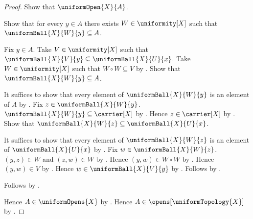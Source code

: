 \begin{proof}
    Show that $\uniformOpen{X}{A}$.
    \begin{subproof}
        Show that for every $y\in A$ there exists $W\in\uniformity[X]$
            such that $\uniformBall{X}{W}{y}\subseteq A$.
        \begin{subproof}
            Fix $y\in A$.
            Take $V\in\uniformity[X]$ such that
                $\uniformBall{X}{V}{y}\subseteq\uniformBall{X}{U}{x}$.
            Take $W\in\uniformity[X]$ such that $W\circ W\subseteq V$
                by .
            Show that $\uniformBall{X}{W}{y}\subseteq A$.
            \begin{subproof}
                It suffices to show that every element of
                    $\uniformBall{X}{W}{y}$ is an element of $A$
                    by .
                Fix $z\in\uniformBall{X}{W}{y}$.
                $\uniformBall{X}{W}{y}\subseteq\carrier[X]$
                    by .
                Hence $z\in\carrier[X]$ by .
                Show that $\uniformBall{X}{W}{z}
                    \subseteq\uniformBall{X}{U}{x}$.
                \begin{subproof}
                    It suffices to show that every element of
                        $\uniformBall{X}{W}{z}$ is an element of
                        $\uniformBall{X}{U}{x}$ by .
                    Fix $w\in\uniformBall{X}{W}{z}$.
                    $(y,z)\in W$ and $(z,w)\in W$
                        by .
                    Hence $(y,w)\in W\circ W$ by .
                    Hence $(y,w)\in V$ by .
                    Hence $w\in\uniformBall{X}{V}{y}$
                        by .
                    Follows by .
                \end{subproof}
            \end{subproof}
        \end{subproof}
        Follows by .
    \end{subproof}
    Hence $A\in\uniformOpens{X}$ by .
    Hence $A\in\opens[\uniformTopology{X}]$
        by .
\end{proof}

